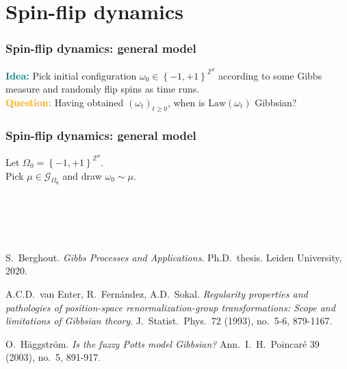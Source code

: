 \documentclass{beamer}
\newcommand{\G}{\mathcal{G}}
\newcommand{\Z}{\mathbb{Z}}
\newcommand{\set}[1]{\left\{#1\right\}}
\newcommand{\1}{\mathbbm{1}}
\newcommand{\5}{\vspace{0.5cm}}
\newcommand{\3}{\vspace{0.3cm}}
\theoremstyle{definition}
\begin{document}

\section{Spin-flip dynamics}


\begin{frame}
\frametitle{Spin-flip dynamics: general model}
\textcolor{teal}{\textbf{Idea:}} Pick initial configuration $\omega_0\in\set{-1,+1}^{\Z^d}$ according to some Gibbs measure and randomly flip spins as time runs. \\\vspace{0.5cm}
\textcolor{orange}{\textbf{Question:}} Having obtained $(\omega_t)_{t\geq 0}$, when is $\mathrm{Law}(\omega_t)$ Gibbsian?
\end{frame}

\begin{frame}
\frametitle{Spin-flip dynamics: general model}
Let $\Omega_0=\set{-1,+1}^{\Z^d}$.\\\vspace{0.5cm}
Pick $\mu\in\G_{\Omega_0}$ and draw $\omega_0\sim\mu$.
\end{frame}


\section*{~}

\begin{frame}
	\begin{thebibliography}{++}

 S.~Berghout. \textit{Gibbs Processes and Applications}. Ph.D.~thesis. Leiden University, 2020.

 A.C.D.~van Enter, R.~Fern\'andez, A.D.~Sokal. \textit{Regularity properties and pathologies of position-space renormalization-group transformations: Scope and limitations of Gibbsian theory}. J.~Statist.~Phys.~72 (1993), no.~5-6, 879-1167.

 O.~H\"aggstr\"om. \textit{Is the fuzzy Potts model Gibbsian?} Ann.~I.~H.~Poincar\'e 39 (2003), no.~5, 891-917.

	\end{thebibliography}
\end{frame}

\end{document}
